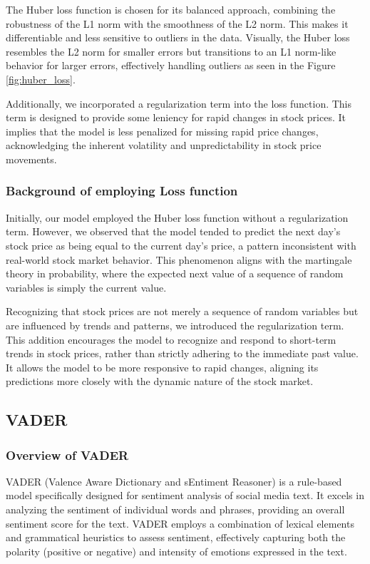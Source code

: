 The Huber loss function is chosen for its balanced approach, combining the robustness of the L1 norm with the smoothness of the L2 norm. 
This makes it differentiable and less sensitive to outliers in the data. 
Visually, the Huber loss resembles the L2 norm for smaller errors but transitions to an L1 norm-like behavior for larger errors, effectively handling outliers as seen in the Figure \ref{fig:huber_loss}.

Additionally, we incorporated a regularization term into the loss function. 
This term is designed to provide some leniency for rapid changes in stock prices. 
It implies that the model is less penalized for missing rapid price changes, acknowledging the inherent volatility and unpredictability in stock price movements.


\subsubsection{Background of employing Loss function}

Initially, our model employed the Huber loss function without a regularization term. 
However, we observed that the model tended to predict the next day's stock price as being equal to the current day's price, a pattern inconsistent with real-world stock market behavior. 
This phenomenon aligns with the martingale theory in probability, where the expected next value of a sequence of random variables is simply the current value.

Recognizing that stock prices are not merely a sequence of random variables but are influenced by trends and patterns, we introduced the regularization term. 
This addition encourages the model to recognize and respond to short-term trends in stock prices, rather than strictly adhering to the immediate past value. 
It allows the model to be more responsive to rapid changes, aligning its predictions more closely with the dynamic nature of the stock market.


\subsection{VADER}

\subsubsection{Overview of VADER}
VADER (Valence Aware Dictionary and sEntiment Reasoner) is a rule-based model specifically designed for sentiment analysis of social media text. 
It excels in analyzing the sentiment of individual words and phrases, providing an overall sentiment score for the text. 
VADER employs a combination of lexical elements and grammatical heuristics to assess sentiment, effectively capturing both the polarity (positive or negative) and intensity of emotions expressed in the text.

